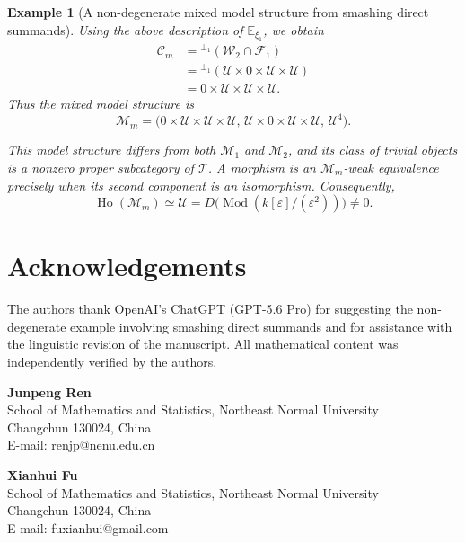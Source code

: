 \documentclass[11pt,a4paper]{amsart}
\numberwithin{equation}{section}
\theoremstyle{plain}
\newtheorem{example}[thm]{Example}
\begin{document}
\begin{example}[A non-degenerate mixed model structure from smashing direct summands]
	Using the above description of $\mathbb E_{\xi_1}$, we obtain
	\[
	\begin{aligned}
		\mathcal C_m
		&={}^{\perp_1}
		(\mathcal W_2\cap\mathcal F_1) \\
		&={}^{\perp_1}
		(\mathcal U\times0\times\mathcal U\times\mathcal U) \\
		&=0\times\mathcal U\times\mathcal U\times\mathcal U.
	\end{aligned}
	\]
	Thus the mixed model structure is
	\[
	\boxed{
		\mathcal M_m=
		\bigl(
		0\times\mathcal U\times\mathcal U\times\mathcal U,\,
		\mathcal U\times0\times\mathcal U\times\mathcal U,\,
		\mathcal U^4
		\bigr).
	}
	\]
	
	This model structure differs from both $\mathcal M_1$ and
	$\mathcal M_2$, and its class of trivial objects is a nonzero proper
	subcategory of $\mathcal T$. A morphism is an
	$\mathcal M_m$-weak equivalence precisely when its second component is
	an isomorphism. Consequently,
	\[
	\operatorname{Ho}(\mathcal M_m)
	\simeq
	\mathcal U
	=
	D\bigl(\operatorname{Mod}(k[\varepsilon]/(\varepsilon^2))\bigr)
	\neq0.
	\]
\end{example}



\section*{Acknowledgements}

The authors thank OpenAI's ChatGPT (GPT-5.6 Pro) for suggesting the
non-degenerate example involving smashing direct summands and for
assistance with the linguistic revision of the manuscript. All mathematical
content was independently verified by the authors.























\vspace{1cm}


\begin{flushleft}
	\textbf{Junpeng Ren}\\
	
	School of Mathematics and Statistics, Northeast Normal University\\
	Changchun 130024, China\\
	E-mail: renjp@nenu.edu.cn
\end{flushleft}



\begin{flushleft}
	\textbf{Xianhui Fu}\\
	
	School of Mathematics and Statistics, Northeast Normal University\\
	Changchun 130024, China\\
	E-mail: fuxianhui@gmail.com
\end{flushleft}





\end{document}
